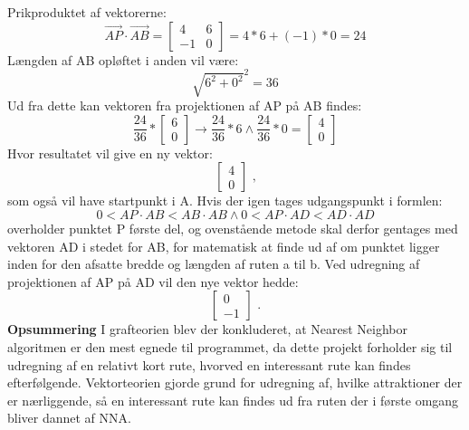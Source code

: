 Prikproduktet af vektorerne: \[ \overrightarrow{AP} \cdot \overrightarrow{AB} = \begin{bmatrix} 4 & 6 \\ -1 & 0 \end{bmatrix} = 4*6+(-1)*0 = 24 \]
Længden af AB opløftet i anden vil være: \[ \sqrt{6^2+0^2}^2 = 36 \]
Ud fra dette kan vektoren fra projektionen af AP på AB findes: 
\[ \frac{24}{36} * \begin{bmatrix} 6 \\ 0 \end{bmatrix} \rightarrow \frac{24}{36} * 6 \wedge \frac{24}{36} * 0 = \begin{bmatrix} 4 \\ 0 \end{bmatrix} \]
Hvor resultatet vil give en ny vektor: \[ \begin{bmatrix} 4 \\ 0 \end{bmatrix} \text{ ,} \] 
som også vil have startpunkt i A. Hvis der igen tages udgangspunkt i formlen:\newline
\[0 < AP \cdot AB < AB \cdot AB \wedge 0 < AP \cdot AD < AD \cdot AD \]
overholder punktet P første del, og ovenstående metode skal derfor gentages med vektoren AD i stedet for AB, for matematisk at finde ud af om punktet ligger inden 	for den afsatte bredde og længden af ruten a til b. Ved udregning af projektionen af AP på AD vil den nye vektor hedde: \[ \begin{bmatrix} 0 \\ -1 \end{bmatrix} \text{ .} \]\newline
\textbf{Opsummering}\newline
I grafteorien blev der konkluderet, at Nearest Neighbor algoritmen er den mest egnede til programmet, da dette projekt forholder sig til udregning af en relativt kort rute, hvorved en interessant rute kan findes efterfølgende. Vektorteorien gjorde grund for udregning af, hvilke attraktioner der er nærliggende, så en interessant rute kan findes ud fra ruten der i første omgang bliver dannet af NNA.

